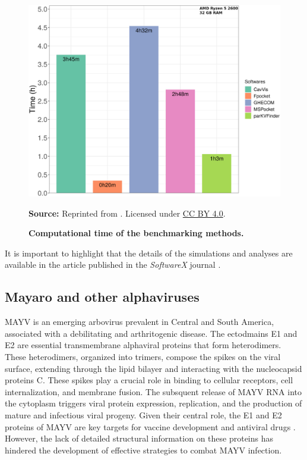\documentclass[Ingles]{phdthesis}
\begin{document}
\begin{figure}[H]
  \centerline{\includegraphics[scale=0.9]{images/hiv1-protease-dm-times.png}}
  \centerline{\tiny{\textbf{Source:} Reprinted from \cite{guerra2020}. Licensed under \href{https://creativecommons.org/licenses/by/4.0/}{CC BY 4.0}.}}
  \caption[Computational time of the benchmarking methods]{\textbf{Computational time of the benchmarking methods.}}
  \label{fig:hiv1-protease-dm-times}
\end{figure}

It is important to highlight that the details of the simulations and analyses are available in the article published in the \textit{SoftwareX} journal \cite{guerra2020}.

\subsection{Mayaro and other alphaviruses}

\ac{MAYV} is an emerging arbovirus prevalent in Central and South America, associated with a debilitating and arthritogenic disease. The ectodmains E1 and E2 are essential transmembrane alphaviral proteins that form heterodimers. These heterodimers, organized into trimers, compose the spikes on the viral surface, extending through the lipid bilayer and interacting with the nucleocapsid proteins C. These spikes play a crucial role in binding to cellular receptors, cell internalization, and membrane fusion. The subsquent release of \acs{MAYV} RNA into the cytoplasm triggers viral protein expression, replication, and the production of mature and infectious viral progeny. Given their central role, the E1 and E2 proteins of \acs{MAYV} are key targets for vaccine development and antiviral drugs \cite{ribeiro2021}. However, the lack of detailed structural information on these proteins has hindered the development of effective strategies to combat \acs{MAYV} infection.
\end{document}
